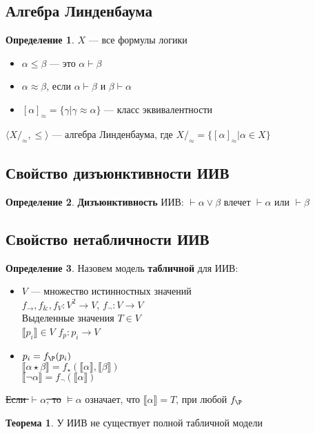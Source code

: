 \documentclass[english]{article}
\newcounter{propertycnt}
\theoremstyle{plain}
\newenvironment{property}{
  \renewcommand\thepropertyinner{\arabic{propertycnt}}
  \propertyinner
}{\endpropertyinner\stepcounter{propertycnt}}
\theoremstyle{remark}
\theoremstyle{definition}
\newtheorem{theorem}{Теорема}[section]
\newtheorem*{definition}{Определение}
\begin{document}
\subsection{Алгебра Линденбаума}
\label{sec:org3ab6859}
\begin{definition}
\(X\) --- все формулы логики
\begin{itemize}
\item \(\alpha \le \beta\) --- это \(\alpha \vdash \beta\)
\item \(\alpha \approx \beta\), если \(\alpha \vdash \beta\) и \(\beta \vdash \alpha\)
\item \([\alpha]_\approx = \{\gamma \big| \gamma \approx \alpha\}\) --- класс эквивалентности
\end{itemize}
\label{orgba752de}
\end{definition}
\begin{property}
\(\langle X/_\approx, \le \rangle\) --- алгебра Линденбаума, где \(X/_\approx = \{[\alpha]_\approx \big| \alpha \in X\}\)
\label{org738b9b3}
\end{property}
\subsection{Свойство дизъюнктивности ИИВ}
\label{sec:org94b8abd}
\begin{definition}
\textbf{Дизъюнктивность} ИИВ: \(\vdash \alpha \vee \beta\) влечет \(\vdash \alpha\) или \(\vdash \beta\)
\label{orgf0dd38e}
\end{definition}
\subsection{Свойство нетабличности ИИВ}
\label{sec:orge9cf82f}
\begin{definition}
Назовем модель \textbf{табличной} для ИИВ:
\begin{itemize}
\item \(V\) --- множество истинностных значений \\
\(f_\to,f_\&, f_V: V^2 \to V\), \(f_\neg: V \to V\) \\
Выделенные значения \(T \in V\) \\
\(\llbracket p_i \rrbracket \in V\) \(f_p : p_i \to V\)
\item \(p_i = f_\P(p_i)\) \\
\(\llbracket\alpha \star \beta\rrbracket = f_\star(\llbracket\alpha\rrbracket, \llbracket\beta\rrbracket)\) \\
\(\llbracket\neg \alpha\rrbracket = f_\neg(\llbracket\alpha\rrbracket)\)
\end{itemize}
\sout{Если \(\vdash \alpha\), то} \(\vDash \alpha\) означает, что \(\llbracket\alpha\rrbracket = T\), при любой \(f_\P\)
\label{orgafc9c83}
\end{definition}
\begin{theorem}
У ИИВ не существует полной табличной модели
\label{orgb852951}
\end{theorem}
\end{document}
